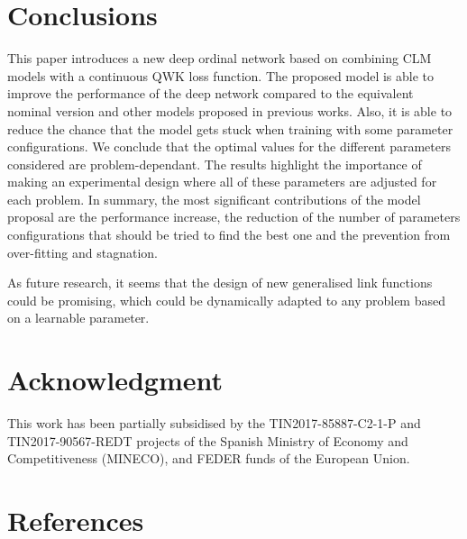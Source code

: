 \documentclass[preprint]{elsarticle}
\begin{document}
\section{Conclusions}
\label{sect:conclusions} 
This paper introduces a new deep ordinal network based on combining CLM models with a continuous QWK loss function. The proposed model is able to improve the performance of the deep network compared to the equivalent nominal version and other models proposed in previous works. Also, it is able to reduce the chance that the model gets stuck when training with some parameter configurations. We conclude that the optimal values for the different parameters considered are problem-dependant. The results highlight the importance of making an experimental design where all of these parameters are adjusted for each problem. In summary, the most significant contributions of the model proposal are the performance increase, the reduction of the number of parameters configurations that should be tried to find the best one and the prevention from over-fitting and stagnation.

As future research, it seems that the design of new generalised link functions could be promising, which could be dynamically adapted to any problem based on a learnable parameter. 

\section*{Acknowledgment}
This work has been partially subsidised by the TIN2017-85887-C2-1-P and TIN2017-90567-REDT projects of the Spanish Ministry of Economy and Competitiveness (MINECO), and FEDER funds of the European Union.


\section*{References}


\end{document}
